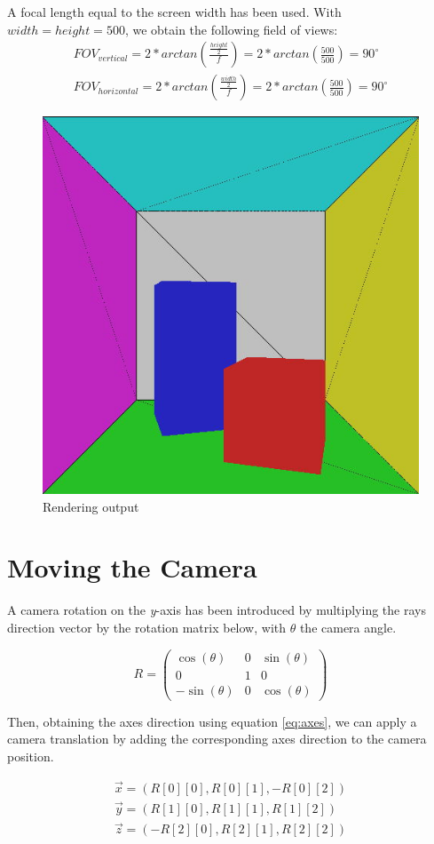 A focal length equal to the screen width has been used. With $width = height = 500$, we obtain the following field of views:
\begin{equation}
\begin{split}
FOV_{vertical} = 2 * arctan(\frac{\frac{height}{2}}{f}) = 2 * arctan(\frac{500}{500}) = 90^\circ\\
FOV_{horizontal} = 2 * arctan(\frac{\frac{width}{2}}{f}) = 2 * arctan(\frac{500}{500}) = 90^\circ
\end{split}
\end{equation}

\begin{figure}[H]
\centering
\includegraphics[width=0.4\linewidth]{img/init.jpg}
\caption{Rendering output}
\end{figure}

\section{Moving the Camera}
A camera rotation on the \textit{y}-axis has been introduced by multiplying the rays direction vector by the rotation matrix below, with $\theta$ the camera angle.

\begin{equation}
R = \left( \begin{array}{ccc}
\cos(\theta) & 0 & \sin(\theta) \\
0 & 1 & 0 \\
-\sin(\theta) & 0 & \cos(\theta) \end{array} \right)
\end{equation}

Then, obtaining the axes direction using equation \ref{eq:axes}, we can apply a camera translation by adding the corresponding axes direction to the camera position.

\begin{equation}
\label{eq:axes}
\begin{split}
\vec{x} = ( R[0][0], R[0][1], - R[0][2] )\\
\vec{y} = ( R[1][0], R[1][1], R[1][2] )\\
\vec{z} = ( - R[2][0], R[2][1], R[2][2] )
\end{split}
\end{equation}

